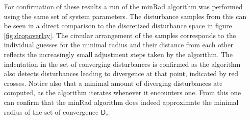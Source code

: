     For confirmation of these results a run of the minRad algorithm was performed using the same set of system parameters. The disturbance samples from this can be seen in a direct comparison to the discretized disturbance space in figure \ref{fig:dropoverlay}. The circular arrangement of the samples corresponds to the individual guesses for the minimal radius and their distance from each other reflects the increasingly small adjustment steps taken by the algorithm. The indentation in the set of converging disturbances is confirmed as the algorithm also detects disturbances leading to divergence at that point, indicated by red crosses. Notice also that a minimal amount of diverging disturbances ate computed, as the algorithm iterates whenever it encounters one. From this one can confirm that the minRad algorithm does indeed approximate the minimal radius of the set of convergence $\mathsf{D}_c$.

